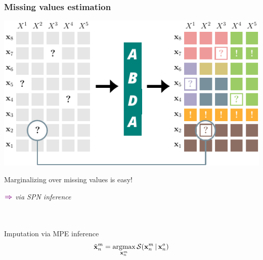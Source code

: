 \documentclass[xcolor={usenames,dvipsnames,svgnames}, compress, aspectratio=169, 11pt]{beamer}
\newcommand{\argmax}{\operatornamewithlimits{argmax}}
\newcommand{\cndbar}{\,|\,}
\newcommand{\SPN}{\mathcal{S}}
\newcommand{\x}{\mathbf{x}}
\newcommand{\comment}[3][\small]{\begin{minipage}{1\linewidth}
          \raggedleft
          {
            $\color{violet}\boldsymbol\Rightarrow$
            #1
            {\emph{#2}}
          }
      \end{minipage}#3\\
}
\begin{document}
\begin{frame}[t, htt=bgrey2]
  \frametitle{Missing values estimation}

  \large
  \begin{minipage}[t]{0.66\linewidth}
    \includegraphics[width=.99\linewidth]{figures/abda-miss}
  \end{minipage}\hfill\begin{minipage}[t]{0.3\linewidth}
    \vspace{-150pt}
    Marginalizing over missing values is easy!\\
    \comment{via SPN inference}\\

    Imputation via MPE inference\\
    $$\tilde{\x}_{n}^{m}=\argmax_{\x_{n}^{m}}\SPN(\x_{n}^{m} \cndbar \x_{n}^{o})$$
    
  \end{minipage}  
\end{frame}
\end{document}
